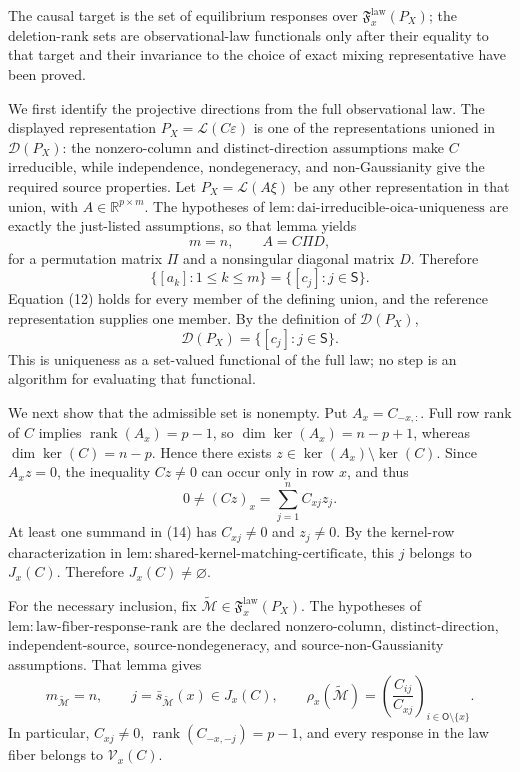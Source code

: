 The causal target is the set of equilibrium responses over \(\mathfrak F_x^{\mathrm{law}}(P_X)\); the deletion-rank sets are observational-law functionals only after their equality to that target and their invariance to the choice of exact mixing representative have been proved.

We first identify the projective directions from the full observational law. The displayed representation \(P_X=\mathcal L(C\varepsilon)\) is one of the representations unioned in \(\mathcal D(P_X)\): the nonzero-column and distinct-direction assumptions make \(C\) irreducible, while independence, nondegeneracy, and non-Gaussianity give the required source properties. Let \(P_X=\mathcal L(A\xi)\) be any other representation in that union, with \(A\in\mathbb R^{p\times m}\). The hypotheses of \(\mathrm{lem:dai\text{-}irreducible\text{-}oica\text{-}uniqueness}\) are exactly the just-listed assumptions, so that lemma yields
\[
 m=n,
 \qquad
 A=C\Pi D, \tag{11}
\]
for a permutation matrix \(\Pi\) and a nonsingular diagonal matrix \(D\). Therefore
\[
 \{[a_k]:1\le k\le m\}=\{[c_j]:j\in\mathsf S\}. \tag{12}
\]
Equation (12) holds for every member of the defining union, and the reference representation supplies one member. By the definition of \(\mathcal D(P_X)\),
\[
 \mathcal D(P_X)=\{[c_j]:j\in\mathsf S\}. \tag{13}
\]
This is uniqueness as a set-valued functional of the full law; no step is an algorithm for evaluating that functional.

We next show that the admissible set is nonempty. Put \(A_x=C_{-x,:}\). Full row rank of \(C\) implies \(\operatorname{rank}(A_x)=p-1\), so \(\dim\ker(A_x)=n-p+1\), whereas \(\dim\ker(C)=n-p\). Hence there exists \(z\in\ker(A_x)\setminus\ker(C)\). Since \(A_xz=0\), the inequality \(Cz\ne0\) can occur only in row \(x\), and thus
\[
 0\ne(Cz)_x=\sum_{j=1}^n C_{xj}z_j. \tag{14}
\]
At least one summand in (14) has \(C_{xj}\ne0\) and \(z_j\ne0\). By the kernel-row characterization in \(\mathrm{lem:shared\text{-}kernel\text{-}matching\text{-}certificate}\), this \(j\) belongs to \(J_x(C)\). Therefore \(J_x(C)\ne\varnothing\).

For the necessary inclusion, fix \(\widetilde{\mathcal M}\in\mathfrak F_x^{\mathrm{law}}(P_X)\). The hypotheses of \(\mathrm{lem:law\text{-}fiber\text{-}response\text{-}rank}\) are the declared nonzero-column, distinct-direction, independent-source, source-nondegeneracy, and source-non-Gaussianity assumptions. That lemma gives
\[
 m_{\widetilde{\mathcal M}}=n,
 \qquad
 j=\bar s_{\widetilde{\mathcal M}}(x)\in J_x(C),
 \qquad
 \rho_x(\widetilde{\mathcal M})
 =\left(\frac{C_{ij}}{C_{xj}}\right)_{i\in\mathsf O\setminus\{x\}}. \tag{15}
\]
In particular, \(C_{xj}\ne0\), \(\operatorname{rank}(C_{-x,-j})=p-1\), and every response in the law fiber belongs to \(\mathcal V_x(C)\).

